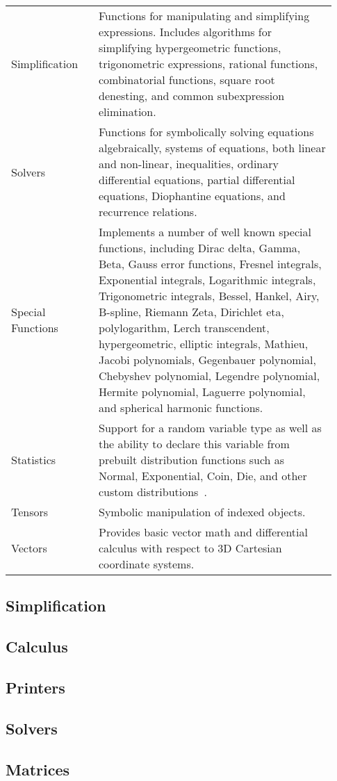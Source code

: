 \begin{longtable}[htbc]{p{0.25\linewidth}p{0.68\linewidth}}
Simplification & Functions for manipulating and simplifying expressions.
Includes algorithms for simplifying hypergeometric functions, trigonometric
expressions, rational functions, combinatorial functions, square root
denesting, and common subexpression elimination.\\

Solvers & Functions for symbolically solving equations algebraically, systems
of equations, both linear and non-linear, inequalities, ordinary differential
equations, partial differential equations, Diophantine equations, and
recurrence relations.\\

Special Functions & Implements a number of well known special functions,
including Dirac delta, Gamma, Beta, Gauss error functions, Fresnel integrals,
Exponential integrals, Logarithmic integrals, Trigonometric integrals, Bessel,
Hankel, Airy, B-spline, Riemann Zeta, Dirichlet eta, polylogarithm, Lerch
transcendent, hypergeometric, elliptic integrals, Mathieu, Jacobi polynomials,
Gegenbauer polynomial, Chebyshev polynomial, Legendre polynomial, Hermite
polynomial, Laguerre polynomial, and
spherical harmonic functions.\\

Statistics & Support for a random variable type as well as the ability to
declare this variable from prebuilt distribution functions such as
Normal, Exponential, Coin, Die, and other custom distributions~\cite{StatsMRocklin}.\\

Tensors & Symbolic manipulation of indexed objects.\\

Vectors & Provides basic vector math and differential calculus with respect
to 3D Cartesian coordinate systems.\\
\bottomrule

\end{longtable}

\subsection{Simplification}



\subsection{Calculus}
\label{sec:calculus}


\subsection{Printers}



\subsection{Solvers}


\subsection{Matrices}


